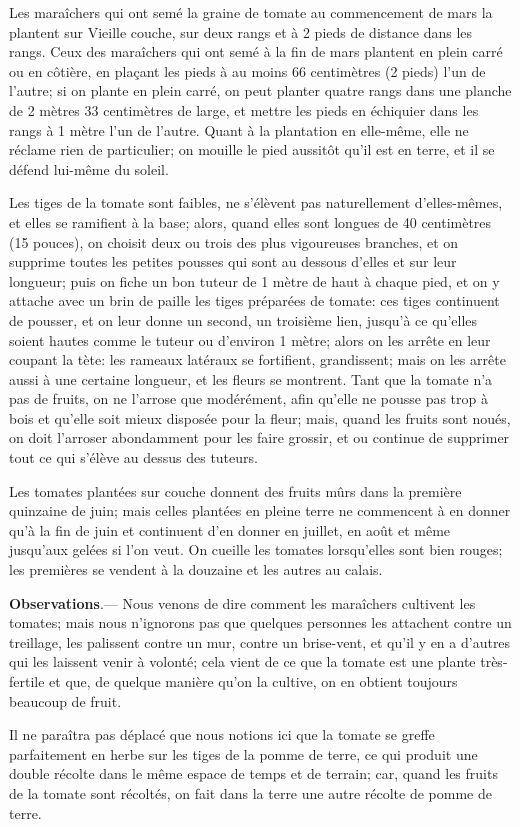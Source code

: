 \documentclass[10pt,a4paper]{book}
\begin{document}
Les maraîchers qui ont semé la graine de tomate au commencement de mars la plantent sur Vieille couche, sur deux rangs et à 2 pieds de distance dans les rangs. Ceux des maraîchers qui ont semé à la fin de mars plantent en plein carré ou en côtière, en plaçant les pieds à au moins 66 centimètres (2 pieds) l'un de l'autre; si on plante en plein carré, on peut planter quatre rangs dans une planche de 2 mètres 33 centimètres de large, et mettre les pieds en échiquier dans les rangs à 1 mètre l'un de l'autre. Quant à la plantation en elle-même, elle ne réclame rien de particulier; on mouille le pied aussitôt qu'il est en terre, et il se défend lui-même du soleil.

Les tiges de la tomate sont faibles, ne s'élèvent pas naturellement d'elles-mêmes, et elles se ramifient à la base; alors, quand elles sont longues de 40 centimètres (15 pouces), on choisit deux ou trois des plus vigoureuses branches, et on supprime toutes les petites pousses qui sont au dessous d'elles et sur leur longueur; puis on fiche un bon tuteur de 1 mètre de haut à chaque pied, et on y attache avec un brin de paille les tiges préparées de tomate: ces tiges continuent de pousser, et on leur donne un second, un troisième lien, jusqu'à ce qu'elles soient hautes comme le tuteur ou d'environ 1 mètre; alors on les arrête en leur coupant la tète: les rameaux latéraux se fortifient, grandissent; mais on les arrête aussi à une certaine longueur, et les fleurs se montrent. Tant que la tomate n'a pas de fruits, on ne l'arrose que modérément, afin qu'elle ne pousse pas trop à bois et qu'elle soit mieux disposée pour la fleur; mais, quand les fruits sont noués, on doit l'arroser abondamment pour les faire grossir, et ou continue de supprimer tout ce qui s'élève au dessus des tuteurs.

Les tomates plantées sur couche donnent des fruits mûrs dans la première quinzaine de juin; mais celles plantées en pleine terre ne commencent à en donner qu'à la fin de juin et continuent d'en donner en juillet, en août et même jusqu'aux gelées si l'on veut. On cueille les tomates lorsqu'elles sont bien rouges; les premières se vendent à la douzaine et les autres au calais.

\begin{small}
\textbf{Observations}.--- Nous venons de dire comment les maraîchers cultivent les tomates; mais nous n'ignorons pas que quelques personnes les attachent contre un treillage, les palissent contre un mur, contre un brise-vent, et qu'il y en a d'autres qui les laissent venir à volonté; cela vient de ce que la tomate est une plante très-fertile et que, de quelque manière qu'on la cultive, on en obtient toujours beaucoup de fruit.

Il ne paraîtra pas déplacé que nous notions ici que la tomate se greffe parfaitement en herbe sur les tiges de la pomme de terre, ce qui produit une double récolte dans le même espace de temps et de terrain; car, quand les fruits de la tomate sont récoltés, on fait dans la terre une autre récolte de pomme de terre.
\end{small}
\end{document}

